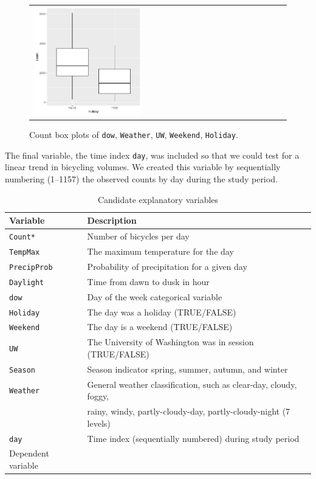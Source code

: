\documentclass [11pt, proquest] {uwthesis}[2015/03/03]
\begin{document}
\begin{figure}
\begin{tabular}{ll}
\includegraphics[width=0.45\textwidth]{figures/holiday_cat}\\
\end{tabular}
\vspace{-10pt}
\caption{Count box plots of \texttt{dow}, \texttt{Weather}, \texttt{UW}, \texttt{Weekend}, \texttt{Holiday}.}
\label{fig:cat_bxplot}
\end{figure}

The final variable, the time index \texttt{day}, was included so that we could test for a linear trend in bicycling volumes. We created this variable by sequentially numbering (1--1157) the observed counts by day during the study period.

\begin{table}
\begin{center}
\caption{Candidate explanatory variables}
\begin{tabular}{l l} 
 \hline
Variable & Description \\
\hline
\texttt{Count*} & Number of bicycles per day \\
\texttt{TempMax} & The maximum temperature for the day \\
\texttt{PrecipProb} & Probability of precipitation for a given day \\
\texttt{Daylight} & Time from dawn to dusk in hour\\
\texttt{dow} & Day of the week categorical variable \\
\texttt{Holiday} & The day was a holiday (TRUE/FALSE) \\
\texttt{Weekend} & The day is a weekend (TRUE/FALSE) \\
\texttt{UW} & The University of Washington was in session (TRUE/FALSE) \\
\texttt{Season} & Season indicator spring, summer, autumn, and winter \\
\texttt{Weather} & General weather classification, such as clear-day, cloudy, foggy, \\
 & rainy, windy, partly-cloudy-day, partly-cloudy-night (7 levels)\\
\texttt{day}  & Time index (sequentially numbered) during study period \\
\hline
\textttt{*} \quad Dependent variable
\label{tb:variables}
\end{tabular}
\end{center}
\vspace{-1cm}
\end{table}
\end{document}
